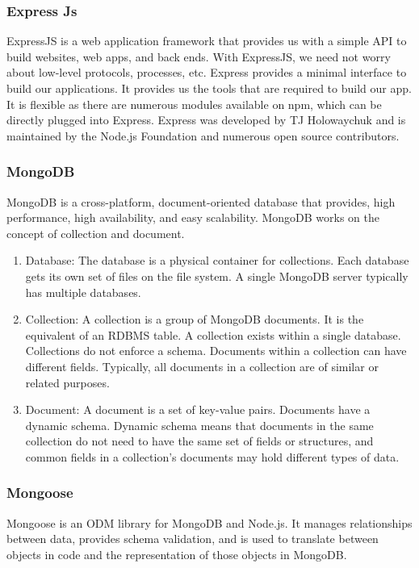 \subsubsection{Express Js}
ExpressJS is a web application framework that provides us with a simple API to build websites, web apps, and back ends. With ExpressJS, we need not worry about low-level protocols, processes, etc.
Express provides a minimal interface to build our applications. It provides us the tools that are required to build our app. It is flexible as there are numerous modules available on npm, which can be directly plugged into Express.
Express was developed by TJ Holowaychuk and is maintained by the Node.js Foundation and numerous open source contributors.



\subsubsection{MongoDB}
MongoDB is a cross-platform, document-oriented database that provides, high performance, high availability, and easy scalability. MongoDB works on the concept of collection and document.
\begin{enumerate}
      \item
            Database:
            The database is a physical container for collections. Each database gets its own set of files on the file system. A single MongoDB server typically has multiple databases.
      \item
            Collection:
            A collection is a group of MongoDB documents. It is the equivalent of an RDBMS table. A collection exists within a single database. Collections do not enforce a schema. Documents within a collection can have different fields. Typically, all documents in a collection are of similar or related purposes.
      \item
            Document:
            A document is a set of key-value pairs. Documents have a dynamic schema. Dynamic schema means that documents in the same collection do not need to have the same set of fields or structures, and common fields in a collection's documents may hold different types of data.
\end{enumerate}


\subsubsection{Mongoose}
Mongoose is an \ac{ODM} library for MongoDB and Node.js. It manages relationships between data, provides schema validation, and is used to translate between objects in code and the representation of those objects in MongoDB.





